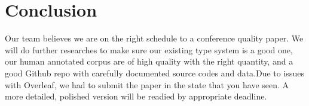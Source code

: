 \documentclass{article} %
\begin{document}

\section{Conclusion}
Our team believes we are on the right schedule to a conference quality paper. We will do further researches to make sure our existing type system is a good one, our human annotated corpus are of high quality with the right quantity, and a good Github repo with carefully documented source codes and data.Due to issues with Overleaf, we had to submit the paper in the state that you have seen. A more detailed, polished version will be readied by appropriate deadline.



\end{document}
